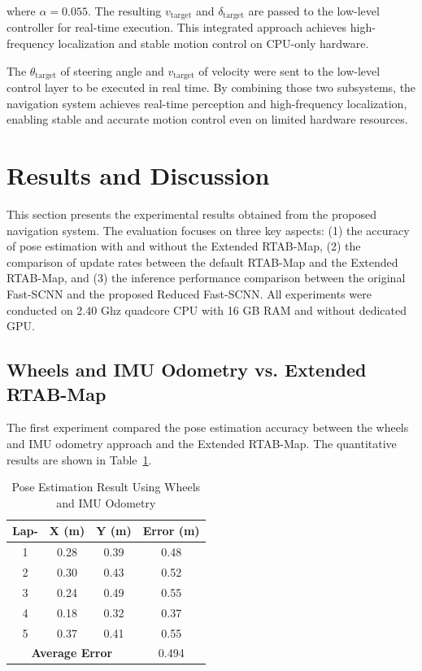\documentclass[conference, a4paper]{IEEEtran}[2015/08/26]
\begin{document}
where $\alpha = 0.055$. The resulting $v_{\text{target}}$ and $\delta_{\text{target}}$ are passed to the low-level controller for real-time execution. This integrated approach achieves high-frequency localization and stable motion control on CPU-only hardware.

The $\theta_{\text{target}}$ of steering angle and $v_{\text{target}}$ of velocity were sent to the low-level control layer to be executed in real time. By combining those two subsystems, the navigation system achieves real-time perception and high-frequency localization, enabling stable and accurate motion control even on limited hardware resources.


\section{Results and Discussion} 
This section presents the experimental results obtained from the proposed navigation system. The evaluation focuses on three key aspects: (1) the accuracy of pose estimation with and without the Extended RTAB-Map, (2) the comparison of update rates between the default RTAB-Map and the Extended RTAB-Map, and (3) the inference performance comparison between the original Fast-SCNN and the proposed Reduced Fast-SCNN. All experiments were conducted on 2.40 Ghz quadcore CPU with 16 GB RAM and without dedicated GPU.

\subsection{Wheels and IMU Odometry vs. Extended RTAB-Map} 
The first experiment compared the pose estimation accuracy between the wheels and IMU odometry approach and the Extended RTAB-Map. The quantitative results are shown in Table~\ref{tab:pose_estimation}.

\begin{table}[H]
	\centering
	\caption{Pose Estimation Result Using Wheels and IMU Odometry}
	\label{tab:pose_estimation}
	\begin{tabular}{|c|c|c|c|}
		\hline
		\textbf{Lap-} & \textbf{X (m)} & \textbf{Y (m)} & \textbf{Error (m)} \\ \hline
		1 & 0.28 & 0.39 & 0.48 \\ \hline
		2 & 0.30 & 0.43 & 0.52 \\ \hline
		3 & 0.24 & 0.49 & 0.55 \\ \hline
		4 & 0.18 & 0.32 & 0.37 \\ \hline
		5 & 0.37 & 0.41 & 0.55 \\ \hline
		\multicolumn{3}{|c|}{\textbf{Average Error}} & 0.494 \\ \hline
	\end{tabular}
\end{table}
\end{document}
